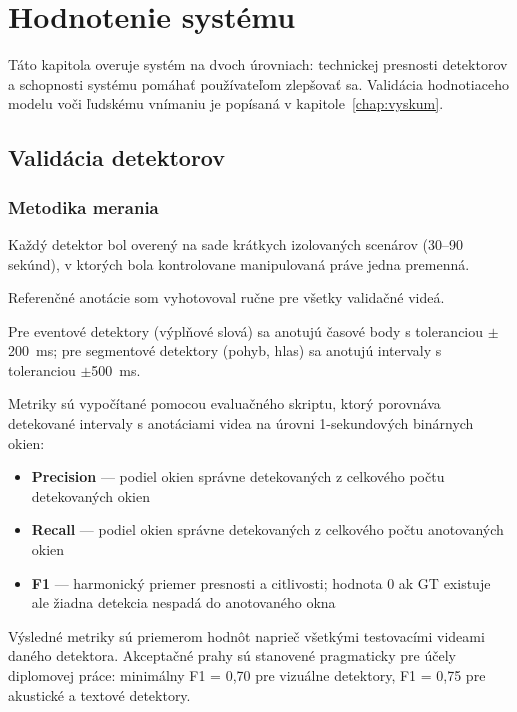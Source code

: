 \chapter{Hodnotenie systému}
\label{chap:hodnotenie}

Táto kapitola overuje systém na dvoch úrovniach: technickej presnosti detektorov a schopnosti systému pomáhať používateľom zlepšovať sa. Validácia hodnotiaceho modelu voči ľudskému vnímaniu je popísaná v kapitole~\ref{chap:vyskum}.

\section{Validácia detektorov}
\label{sec:detector_validation}

\subsection{Metodika merania}

Každý detektor bol overený na sade krátkych izolovaných scenárov (30--90 sekúnd), v ktorých bola kontrolovane manipulovaná práve jedna premenná.

Referenčné anotácie som vyhotovoval ručne pre všetky validačné videá.

Pre eventové detektory (výplňové slová) sa anotujú časové body s toleranciou $\pm$200~ms; pre segmentové detektory (pohyb, hlas) sa anotujú intervaly s toleranciou $\pm$500~ms.

Metriky sú vypočítané pomocou evaluačného skriptu, ktorý porovnáva detekované intervaly s anotáciami videa na úrovni 1-sekundových binárnych okien:

\begin{itemize}
    \item \textbf{Precision} --- podiel okien správne detekovaných z celkového počtu detekovaných okien
    \item \textbf{Recall} --- podiel okien správne detekovaných z celkového počtu anotovaných okien
    \item \textbf{F1} --- harmonický priemer presnosti a citlivosti; hodnota 0 ak GT existuje ale žiadna detekcia nespadá do anotovaného okna
\end{itemize}

Výsledné metriky sú priemerom hodnôt naprieč všetkými testovacími videami daného detektora. Akceptačné prahy sú stanovené pragmaticky pre účely diplomovej práce: minimálny F1 = 0,70 pre vizuálne detektory, F1 = 0,75 pre akustické a textové detektory.

